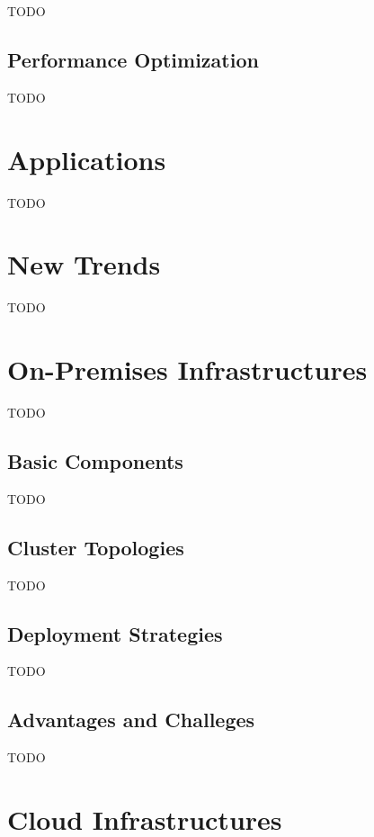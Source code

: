 TODO

\subsection{Performance Optimization}
\label{ssec:performance-optimization}

TODO

\section{Applications}
\label{sec:applications}

TODO

\section{New Trends}
\label{sec:new-trends}

TODO

\section{On-Premises Infrastructures}
\label{sec:on-premises-infrastructures}

TODO

\subsection{Basic Components}
\label{ssec:basic-components}

TODO

\subsection{Cluster Topologies}
\label{ssec:cluster-topologies}

TODO

\subsection{Deployment Strategies}
\label{ssec:on-premises-infrastructures-deployment-strategies}

TODO

\subsection{Advantages and Challeges}
\label{ssec:on-premises-infrastructures-advantages-and-challeges}

TODO

\section{Cloud Infrastructures}
\label{sec:cloud-infrastructures}

